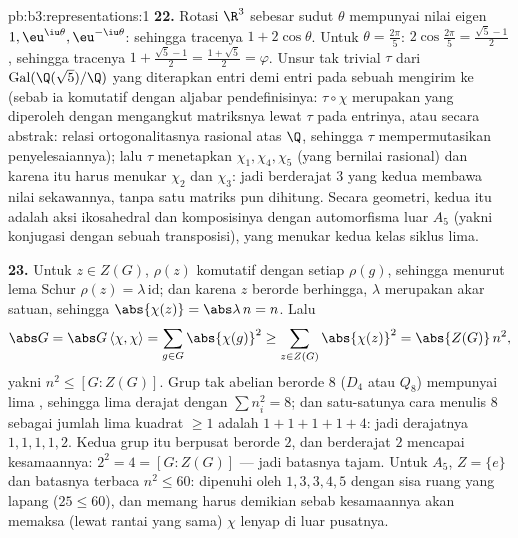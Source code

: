 \begin{solution}{pb:b3:representations:1}
\textbf{22.} Rotasi $\R^3$ sebesar sudut $\theta$ mempunyai
nilai eigen $1, \eu^{\iu\theta}, \eu^{-\iu\theta}$: sehingga tracenya $1 +
2\cos\theta$. Untuk $\theta = \frac{2\pi}5$: $2\cos\frac{2\pi}5
= \frac{\sqrt5 - 1}2$, sehingga tracenya $1 + \frac{\sqrt5-1}2 =
\frac{1+\sqrt5}2 = \varphi$. Unsur tak trivial $\tau$ dari
$\operatorname{Gal}(\Q(\sqrt5)/\Q)$ yang diterapkan entri demi entri pada sebuah
 mengirim  ke  (sebab ia komutatif
dengan aljabar pendefinisinya: $\tau\circ\chi$ merupakan 
 yang diperoleh dengan mengangkut matriksnya lewat
$\tau$ pada entrinya, atau secara abstrak: relasi ortogonalitasnya
rasional atas $\Q$, sehingga $\tau$ mempermutasikan penyelesaiannya);
lalu $\tau$ menetapkan $\chi_1, \chi_4, \chi_5$ (yang bernilai rasional) dan
karena itu harus menukar $\chi_2$ dan $\chi_3$: jadi 
berderajat $3$ yang kedua membawa nilai sekawannya, tanpa satu matriks pun
dihitung. Secara geometri, kedua  itu adalah aksi
ikosahedral dan komposisinya dengan automorfisma luar
$A_5$ (yakni konjugasi dengan sebuah transposisi), yang
menukar kedua kelas siklus lima.

\textbf{23.} Untuk $z \in Z(G)$, $\rho(z)$ komutatif dengan setiap
$\rho(g)$, sehingga menurut lema Schur $\rho(z) = \lambda\,
\mathrm{id}$; dan karena $z$ berorde berhingga, $\lambda$ merupakan akar
satuan, sehingga $\abs{\chi(z)} = \abs\lambda\,n = n$. Lalu
\[
\abs G = \abs G\,\langle\chi, \chi\rangle
= \sum_{g \in G}\abs{\chi(g)}^2
\geq \sum_{z \in Z(G)}\abs{\chi(z)}^2
= \abs{Z(G)}\,n^2,
\]
yakni $n^2 \leq [G : Z(G)]$. Grup tak abelian berorde $8$
($D_4$ atau $Q_8$) mempunyai lima , sehingga lima
derajat  dengan $\sum n_i^2 = 8$; dan satu-satunya cara
menulis $8$ sebagai jumlah lima kuadrat $\geq 1$ adalah $1 + 1 + 1 + 1
+ 4$: jadi derajatnya $1, 1, 1, 1, 2$. Kedua grup itu berpusat
berorde $2$, dan  berderajat $2$ mencapai kesamaannya:
$2^2 = 4 = [G : Z(G)]$ --- jadi batasnya tajam. Untuk $A_5$,
$Z = \{e\}$ dan batasnya terbaca $n^2 \leq 60$: dipenuhi oleh
$1, 3, 3, 4, 5$ dengan sisa ruang yang lapang ($25 \leq 60$), dan memang harus
demikian sebab kesamaannya akan memaksa (lewat rantai yang sama) $\chi$
lenyap di luar pusatnya.


\end{solution}
